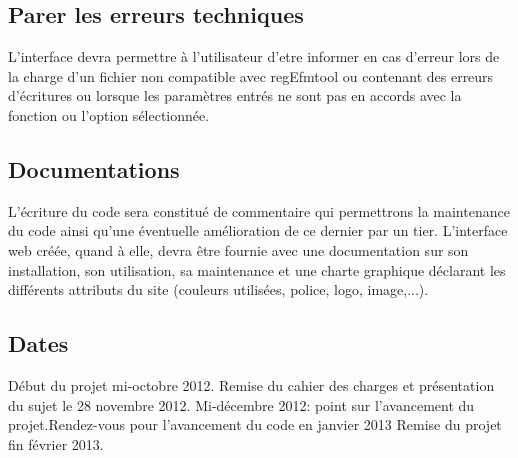 \subsection{Parer les erreurs techniques}
L'interface devra permettre à l'utilisateur d'etre informer en cas d'erreur lors de la charge d'un fichier non compatible avec regEfmtool ou contenant des erreurs d'écritures ou lorsque les paramètres entrés ne sont pas en accords avec la fonction ou l'option sélectionnée. 

\subsection{Documentations}
L'écriture du code sera constitué de commentaire qui permettrons la maintenance du code ainsi qu'une éventuelle amélioration de ce dernier par un tier.
L'interface web créée, quand à elle, devra être fournie avec une documentation sur son installation, son utilisation, sa maintenance et une charte graphique déclarant les différents attributs du site (couleurs utilisées, police, logo, image,...).

\subsection{Dates}
Début du projet mi-octobre 2012. Remise du cahier des charges et présentation du sujet le 28 novembre 2012.  Mi-décembre 2012: point sur l'avancement du projet.Rendez-vous pour l'avancement du code en janvier 2013 Remise du projet fin février 2013.